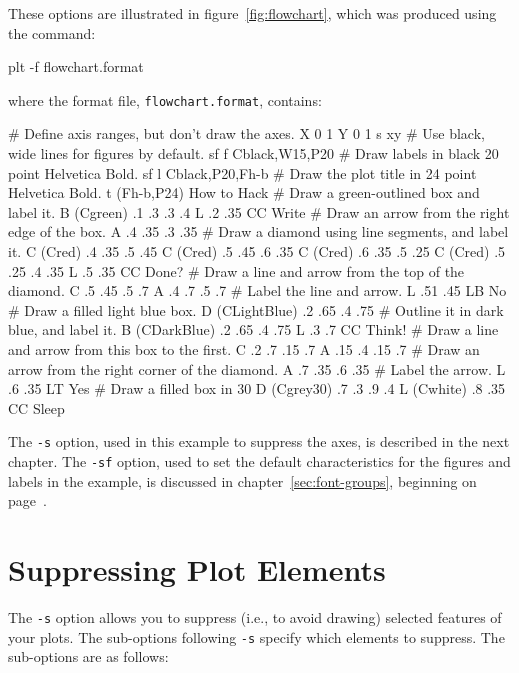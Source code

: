 \documentclass{book}
\begin{document}
These options are illustrated in figure~\ref{fig:flowchart}, which was
produced using the command:
\begin{center}
\begin{boxedverbatim}
plt -f flowchart.format
\end{boxedverbatim}
\end{center}
where the format file, {\tt flowchart.format}, contains:
\begin{center}
\begin{boxedverbatim}
# Define axis ranges, but don't draw the axes.
X 0 1
Y 0 1
s xy
# Use black, wide lines for figures by default.
sf f Cblack,W15,P20
# Draw labels in black 20 point Helvetica Bold.
sf l Cblack,P20,Fh-b
# Draw the plot title in 24 point Helvetica Bold.
t (Fh-b,P24) How to Hack
# Draw a green-outlined box and label it.
B (Cgreen) .1 .3 .3 .4
L .2 .35 CC Write
# Draw an arrow from the right edge of the box.
A .4 .35 .3 .35
# Draw a diamond using line segments, and label it.
C (Cred) .4 .35 .5 .45
C (Cred) .5 .45 .6 .35
C (Cred) .6 .35 .5 .25
C (Cred) .5 .25 .4 .35
L .5 .35 CC Done?
# Draw a line and arrow from the top of the diamond.
C .5 .45 .5 .7
A .4 .7 .5 .7
# Label the line and arrow.
L .51 .45 LB No
# Draw a filled light blue box.
D (CLightBlue) .2 .65 .4 .75
# Outline it in dark blue, and label it.
B (CDarkBlue) .2 .65 .4 .75
L .3 .7 CC Think!
# Draw a line and arrow from this box to the first.
C .2 .7 .15 .7
A .15 .4 .15 .7
# Draw an arrow from the right corner of the diamond.
A .7 .35 .6 .35
# Label the arrow.
L .6 .35 LT Yes
# Draw a filled box in 30%
D (Cgrey30) .7 .3 .9 .4
L (Cwhite) .8 .35 CC Sleep
\end{boxedverbatim}
\end{center}

The {\tt -s} option, used in this example to suppress the axes, is
described in the next chapter.  The {\tt -sf} option, used to set the
default characteristics for the figures and labels in the example, is
discussed in chapter~\ref{sec:font-groups}, beginning on
page~\pageref{sec:font-groups}.

\chapter{Suppressing Plot Elements \label{sec:suppress}}

%
The {\tt -s} option allows you to suppress (i.e., to avoid drawing)
selected features of your plots.  The sub-options following {\tt -s}
specify which elements to suppress.  The sub-options are as follows:
\end{document}
